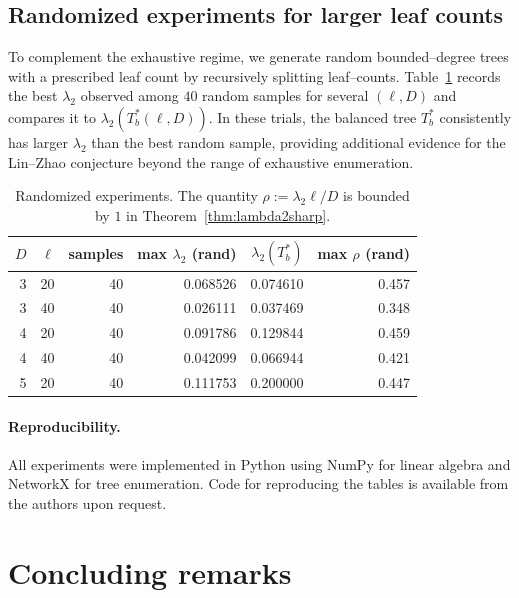 \documentclass[11pt]{article}
\theoremstyle{definition}
\theoremstyle{remark}
\begin{document}
\subsection{Randomized experiments for larger leaf counts}

To complement the exhaustive regime, we generate random bounded--degree trees with a prescribed leaf count by recursively splitting leaf--counts.
Table~\ref{tab:random} records the best $\lambda_2$ observed among $40$ random samples for several $(\ell,D)$ and compares it to $\lambda_2(T_b^*(\ell,D))$.
In these trials, the balanced tree $T_b^*$ consistently has larger $\lambda_2$ than the best random sample, providing additional evidence for the Lin--Zhao conjecture beyond the range of exhaustive enumeration.

\begin{table}[ht]
\centering
\begin{tabular}{r r r r r r}
\hline
$D$ & $\ell$ & samples & max $\lambda_2$ (rand) & $\lambda_2(T_b^*)$ & max $\rho$ (rand)\\
\hline
3 & 20 & 40 & 0.068526 & 0.074610 & 0.457 \\
3 & 40 & 40 & 0.026111 & 0.037469 & 0.348 \\
4 & 20 & 40 & 0.091786 & 0.129844 & 0.459 \\
4 & 40 & 40 & 0.042099 & 0.066944 & 0.421 \\
5 & 20 & 40 & 0.111753 & 0.200000 & 0.447 \\
\hline
\end{tabular}
\caption{Randomized experiments.
The quantity $\rho:=\lambda_2\ell/D$ is bounded by $1$ in Theorem~\ref{thm:lambda2sharp}.}
\label{tab:random}
\end{table}

\paragraph{Reproducibility.}
All experiments were implemented in Python using NumPy for linear algebra and NetworkX for tree enumeration.
Code for reproducing the tables is available from the authors upon request.


\section{Concluding remarks}\label{sec:conclude}
\end{document}
